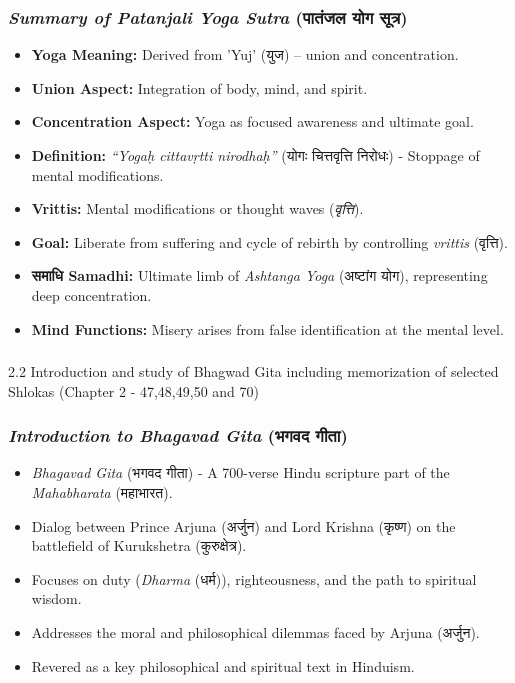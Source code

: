 \begin{frame}[fragile]\frametitle{\textit{Summary of Patanjali Yoga Sutra} (पातंजल योग सूत्र)}

    \begin{itemize}
        \item \textbf{Yoga Meaning:} Derived from 'Yuj' (युज) – union and concentration.
        \item \textbf{Union Aspect:} Integration of body, mind, and spirit.
        \item \textbf{Concentration Aspect:} Yoga as focused awareness and ultimate goal.
        \item \textbf{Definition:} \textit{“Yogaḥ cittavṛtti nirodhaḥ”} (योगः चित्तवृत्ति निरोधः) - Stoppage of mental modifications.
        \item \textbf{Vrittis:} Mental modifications or thought waves (\textit{वृत्ति}).
        \item \textbf{Goal:} Liberate from suffering and cycle of rebirth by controlling \textit{vrittis} (वृत्ति).
        \item \textbf{समाधि Samadhi:} Ultimate limb of \textit{Ashtanga Yoga} (अष्टांग योग), representing deep concentration.
        \item \textbf{Mind Functions:} Misery arises from false identification at the mental level.
    \end{itemize}

\end{frame}


\begin{frame}[fragile]\frametitle{}
\begin{center}
{\Large 2.2 Introduction and study of Bhagwad Gita including memorization of selected Shlokas (Chapter 2 - 47,48,49,50 and 70)}
\end{center}
\end{frame}

\begin{frame}[fragile]\frametitle{\textit{Introduction to Bhagavad Gita} (भगवद गीता)}

      \begin{itemize}
		\item \textit{Bhagavad Gita} (भगवद गीता) - A 700-verse Hindu scripture part of the \textit{Mahabharata} (महाभारत).
		\item Dialog between Prince Arjuna (अर्जुन) and Lord Krishna (कृष्ण) on the battlefield of Kurukshetra (कुरुक्षेत्र).
		\item Focuses on duty (\textit{Dharma} (धर्म)), righteousness, and the path to spiritual wisdom.
		\item Addresses the moral and philosophical dilemmas faced by Arjuna (अर्जुन).
		\item Revered as a key philosophical and spiritual text in Hinduism.
	  \end{itemize}

\end{frame}

